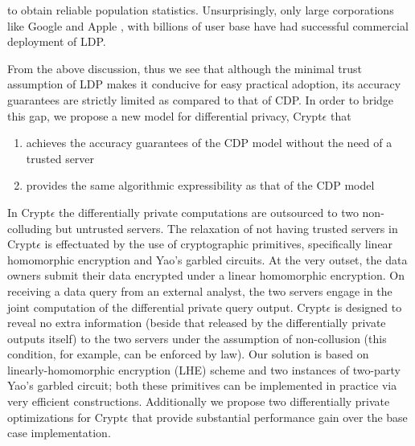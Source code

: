 to obtain reliable population statistics. Unsurprisingly, only large corporations  like Google \cite{Rappor1,Rappor2,Prochlo} and Apple \cite{Apple}, with  billions of user base have had successful commercial deployment of \textsf{LDP}. %
\par From the above discussion, thus we see that although the minimal trust assumption of \textsf{LDP} makes it conducive for easy practical adoption, its accuracy guarantees are strictly limited as compared to that of \textsf{CDP}. In order to bridge this gap, we propose a new model for differential privacy, Crypt$\epsilon$ that  \begin{enumerate}\item achieves the accuracy guarantees of the \textsf{CDP} model without the need of a trusted server \item provides the same algorithmic expressibility as that of the \textsf{CDP} model \end{enumerate} In Crypt$\epsilon$ the differentially private computations are outsourced to two non-colluding but untrusted servers. The relaxation of not having trusted servers in Crypt$\epsilon$ is effectuated by the use of cryptographic primitives, specifically linear homomorphic encryption and Yao's garbled circuits.  At the very outset, the data owners submit their data encrypted under a linear homomorphic encryption. On receiving a data query from an external analyst, the two servers engage in the joint computation of the differential private query output. Crypt$\epsilon$ is designed to reveal no extra information (beside that released by the differentially private outputs itself) to
the two servers under the assumption of  non-collusion (this condition, for example, can be enforced by law). Our solution is  based on linearly-homomorphic
encryption (LHE) scheme and two instances of two-party Yao's garbled circuit; both these primitives can be implemented in practice via very efficient constructions. Additionally we propose two differentially private optimizations for Crypt$\epsilon$ that provide substantial performance gain over the base case implementation.
\par %
